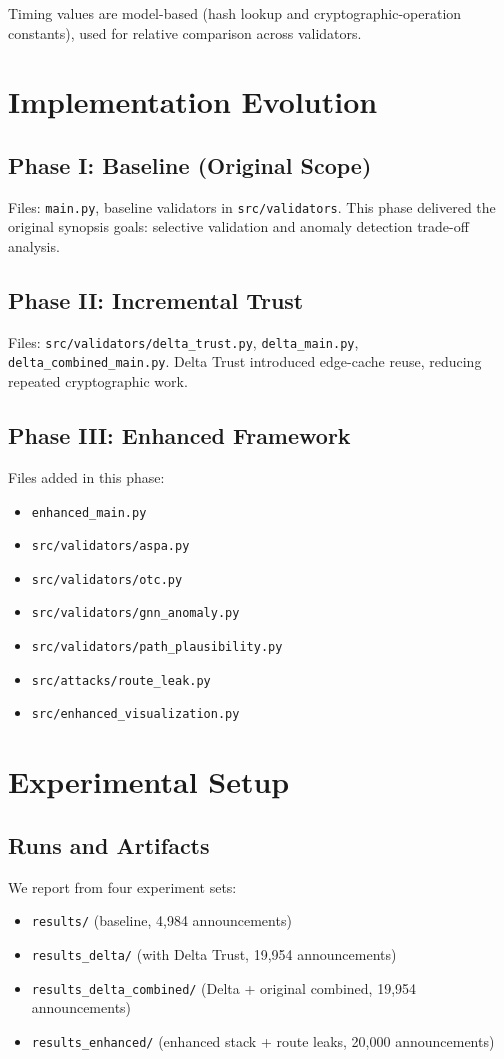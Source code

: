\documentclass[conference]{IEEEtran}
\begin{document}
Timing values are model-based (hash lookup and cryptographic-operation constants), used for relative comparison across validators.

\section{Implementation Evolution}
\subsection{Phase I: Baseline (Original Scope)}
Files: \texttt{main.py}, baseline validators in \texttt{src/validators}. This phase delivered the original synopsis goals: selective validation and anomaly detection trade-off analysis.

\subsection{Phase II: Incremental Trust}
Files: \texttt{src/validators/delta\_trust.py}, \texttt{delta\_main.py}, \texttt{delta\_combined\_main.py}. Delta Trust introduced edge-cache reuse, reducing repeated cryptographic work.

\subsection{Phase III: Enhanced Framework}
Files added in this phase:
\begin{itemize}
\item \texttt{enhanced\_main.py}
\item \texttt{src/validators/aspa.py}
\item \texttt{src/validators/otc.py}
\item \texttt{src/validators/gnn\_anomaly.py}
\item \texttt{src/validators/path\_plausibility.py}
\item \texttt{src/attacks/route\_leak.py}
\item \texttt{src/enhanced\_visualization.py}
\end{itemize}

\section{Experimental Setup}
\subsection{Runs and Artifacts}
We report from four experiment sets:
\begin{itemize}
\item \texttt{results/} (baseline, 4,984 announcements)
\item \texttt{results\_delta/} (with Delta Trust, 19,954 announcements)
\item \texttt{results\_delta\_combined/} (Delta + original combined, 19,954 announcements)
\item \texttt{results\_enhanced/} (enhanced stack + route leaks, 20,000 announcements)
\end{itemize}
\end{document}
